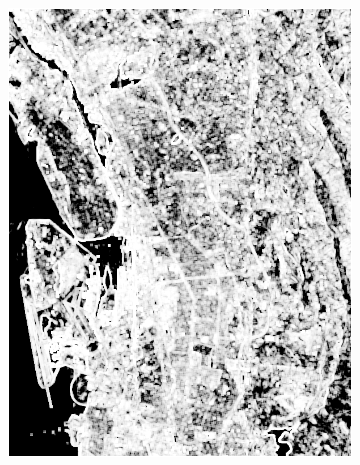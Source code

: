 \begin{figure}[htbp]
	\begin{subfigure}[t]{0.4\columnwidth}
	\centering
	\includegraphics[width = \columnwidth]{Figures/IGRASS15_WORK/alpha_5_5}
	\caption{}
	 \end{subfigure}%
	    ~ 
	 \begin{subfigure}[t]{0.4\columnwidth}
	 \centering

\end{subfigure}
\end{figure}
